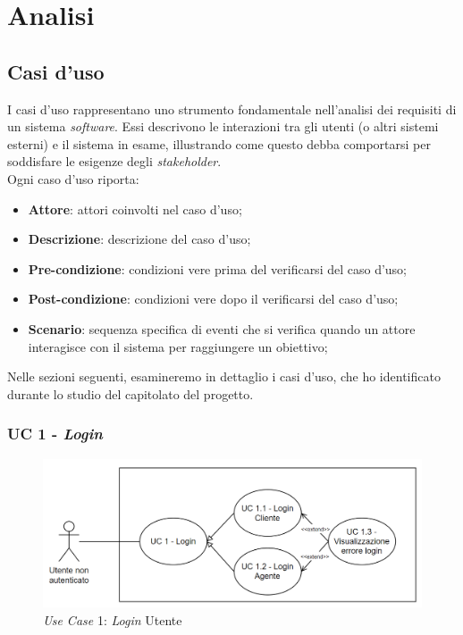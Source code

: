 \section{Analisi}
\subsection{Casi d'uso}
I casi d'uso rappresentano uno strumento fondamentale nell'analisi dei requisiti di un sistema \textit{software}. Essi descrivono 
le interazioni tra gli utenti (o altri sistemi esterni) e il sistema in esame, illustrando come questo debba comportarsi per 
soddisfare le esigenze degli \textit{stakeholder}.\\
Ogni caso d'uso riporta:
\begin{itemize}
    \item \textbf{Attore}: attori coinvolti nel caso d'uso;
    \item \textbf{Descrizione}: descrizione del caso d'uso;
    \item \textbf{Pre-condizione}: condizioni vere prima del verificarsi del caso d'uso;
    \item \textbf{Post-condizione}: condizioni vere dopo il verificarsi del caso d'uso;
    \item \textbf{Scenario}: sequenza specifica di eventi che si verifica quando un attore interagisce con il sistema 
                             per raggiungere un obiettivo;
\end{itemize}
Nelle sezioni seguenti, esamineremo in dettaglio i casi d'uso, che ho identificato durante lo studio del capitolato del progetto.

\subsubsection{UC 1 - \textit{Login}}
\begin{figure}[H]
    \vspace{2em}
    \centering
    \includegraphics[width=0.75\columnwidth]{img/usecase/UC 1.png}
    \caption{\textit{Use Case} 1: \textit{Login} Utente}
    \label{fig:uc_1}
\end{figure}

